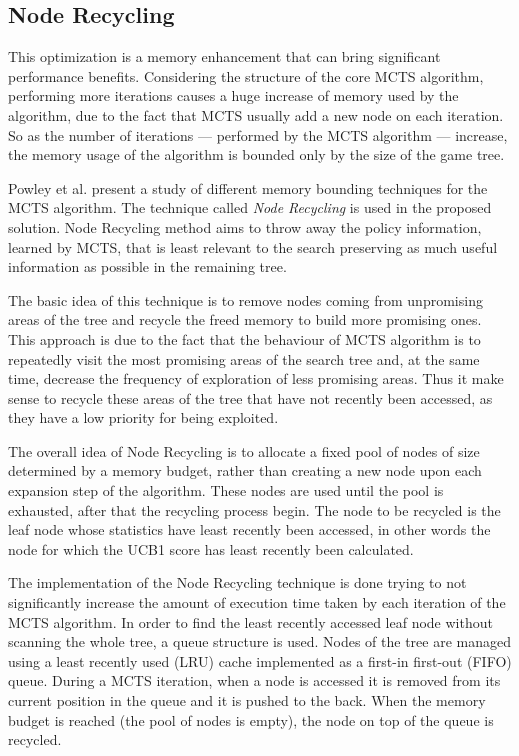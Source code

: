 \subsection{Node Recycling}
This optimization is a memory enhancement that can bring significant performance benefits. Considering the structure of the core MCTS algorithm, performing more iterations causes a huge increase of memory used by the algorithm, due to the fact that MCTS usually add a new node on each iteration. So as the number of iterations --- performed by the MCTS algorithm --- increase, the memory usage of the algorithm is bounded only by the size of the game tree.

\medskip\noindent
Powley et al. \cite{AIIDE1715856} present a study of different memory bounding techniques for the MCTS algorithm. The technique called \textit{Node Recycling} is used in the proposed solution. Node Recycling method aims to throw away the policy information, learned by MCTS, that is least relevant to the search preserving as much useful information as possible in the remaining tree.

\medskip\noindent
The basic idea of this technique is to remove nodes coming from unpromising areas of the tree and recycle the freed memory to build more promising ones. This approach is due to the fact that the behaviour of MCTS algorithm is to repeatedly visit the most promising areas of the search tree and, at the same time, decrease the frequency of exploration of less promising areas. Thus it make sense to recycle these areas of the tree that have not recently been accessed, as they have a low priority for being exploited.

\medskip\noindent
The overall idea of Node Recycling is to allocate a fixed pool of nodes of size determined by a memory budget, rather than creating a new node upon each expansion step of the algorithm. These nodes are used until the pool is exhausted, after that the recycling process begin. The node to be recycled is the leaf node whose statistics have least recently been accessed, in other words the node for which the UCB1 score has least recently been calculated.

\medskip\noindent
The implementation of the Node Recycling technique is done trying to not significantly increase the amount of execution time taken by each iteration of the MCTS algorithm. In order to find the least recently accessed leaf node without scanning the whole tree, a queue structure is used. Nodes of the tree are managed using a least recently used (LRU) cache implemented as a first-in first-out (FIFO) queue. During a MCTS iteration, when a node is accessed it is removed from its current position in the queue and it is pushed to the back. When the memory budget is reached (the pool of nodes is empty), the node on top of the queue is recycled.

